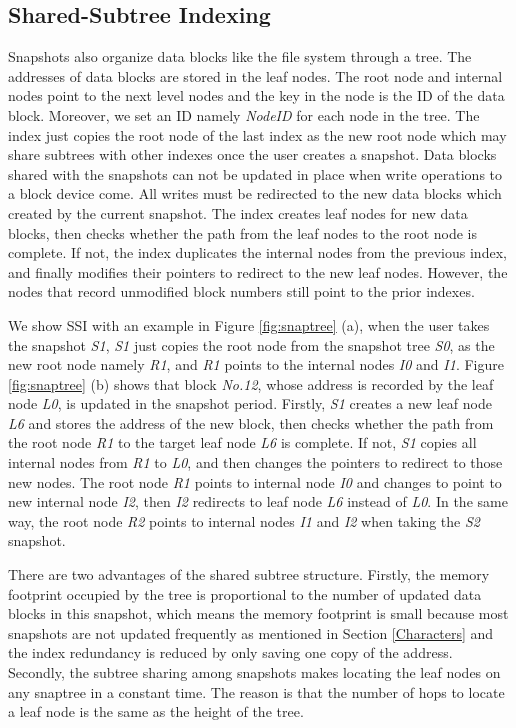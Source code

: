 \documentclass[sigconf, nonacm]{acmart}
\begin{document}
\subsection{Shared-Subtree Indexing}
\label{SSI}
Snapshots also organize data blocks like the file system through a tree. The addresses of data blocks are stored in the leaf nodes. The root node and internal nodes point to the next level nodes and the key in the node is the ID of the data block. Moreover, we set an ID namely \emph{NodeID} for each node in the tree. 
The index just copies the root node of the last index as the new root node which may share subtrees with other indexes once the user creates a snapshot.
Data blocks shared with the snapshots can not be updated in place when write operations to a block device come.  All writes must be redirected to the new data blocks which created by the current snapshot. The index creates leaf nodes for new data blocks, then checks whether the path from the leaf nodes to the root node is complete. If not, the index duplicates the internal nodes from the previous index, and finally modifies their pointers to redirect to the new leaf nodes. However, the nodes that record unmodified block numbers still point to the prior indexes.  


We show SSI with an example in Figure \ref{fig:snaptree} (a), when the user takes the snapshot \emph{S1}, \emph{S1} just copies the root node from the snapshot tree \emph{S0}, as the new root node namely \emph{R1}, and \emph{R1} points to the internal nodes \emph{I0} and \emph{I1}. 
Figure \ref{fig:snaptree} (b) shows that block \emph{No.12}, whose address is recorded by the leaf node \emph{L0}, is updated in the snapshot period. Firstly, \emph{S1} creates a new leaf node \emph{L6} and stores the address of the new block, then checks whether the path from the root node \emph{R1} to the target leaf node \emph{L6} is complete. If not, \emph{S1} copies all internal nodes from \emph{R1} to \emph{L0}, and then changes the pointers to redirect to those new nodes. The root node \emph{R1} points to internal node \emph{I0} and changes to point to new internal node \emph{I2}, then \emph{I2} redirects to leaf node \emph{L6} instead of \emph{L0}. In the same way, the root node \emph{R2} points to internal nodes \emph{I1} and \emph{I2} when taking the \emph{S2} snapshot.

There are two advantages of the shared subtree structure. Firstly, the memory footprint occupied by the tree is proportional to the number of updated data blocks in this snapshot, which means the memory footprint is small because most snapshots are not updated frequently as mentioned in Section \ref{Characters} and the index redundancy is reduced by only saving one copy of the address. 
Secondly, the subtree sharing among snapshots makes locating the leaf nodes on any snaptree in a constant time. The reason is that the number of hops to locate a leaf node is the same as the height of the tree.
\end{document}
